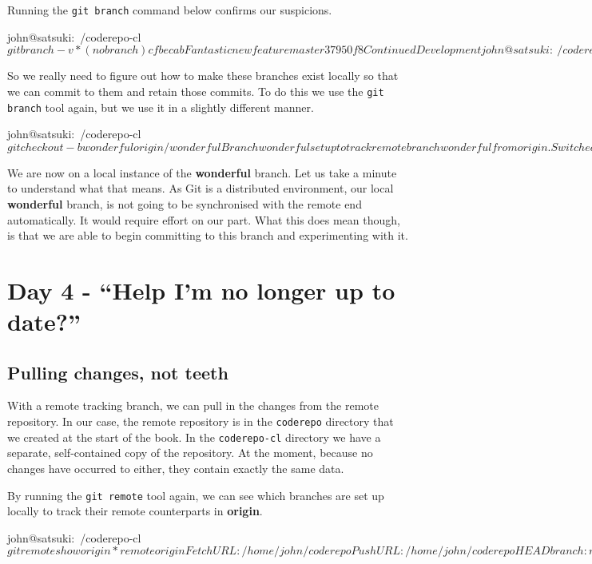 Running the \texttt{git branch} command below confirms our suspicions.

\begin{code}
john@satsuki:~/coderepo-cl$ git branch -v
* (no branch) cfbecab Fantastic new feature
  master      37950f8 Continued Development
john@satsuki:~/coderepo-cl$
\end{code}

So we really need to figure out how to make these branches exist locally so that we can commit to them and retain those commits.
To do this we use the \texttt{git branch} tool again, but we use it in a slightly different manner.

\begin{code}
john@satsuki:~/coderepo-cl$ git checkout -b wonderful origin/wonderful
Branch wonderful set up to track remote branch wonderful from origin.
Switched to a new branch 'wonderful'
john@satsuki:~/coderepo-cl$
\end{code}

We are now on a local instance of the \textbf{wonderful} branch.
Let us take a minute to understand what that means.
As Git is a distributed environment, our local \textbf{wonderful} branch, is not going to be synchronised with the remote end automatically.
It would require effort on our part.
What this does mean though, is that we are able to begin committing to this branch and experimenting with it.

\section{Day 4 - ``Help I'm no longer up to date?''}
\subsection{Pulling changes, not teeth}

With a remote tracking branch, we can pull in the changes from the remote repository.
In our case, the remote repository is in the \texttt{coderepo} directory that we created at the start of the book.
In the \texttt{coderepo-cl} directory we have a separate, self-contained copy of the repository.
At the moment, because no changes have occurred to either, they contain exactly the same data.

By running the \texttt{git remote} tool again, we can see which branches are set up locally to track their remote counterparts in \textbf{origin}.

\begin{code}
john@satsuki:~/coderepo-cl$ git remote show origin
* remote origin
  Fetch URL: /home/john/coderepo
  Push  URL: /home/john/coderepo
  HEAD branch: master
  Remote branches:
    master    tracked
    wonderful tracked
    zaney     tracked
  Local branches configured for 'git pull':
    master    merges with remote master
    wonderful merges with remote wonderful
  Local refs configured for 'git push':
    master    pushes to master    (up to date)
    wonderful pushes to wonderful (up to date)
john@satsuki:~/coderepo-cl$
\end{code}

